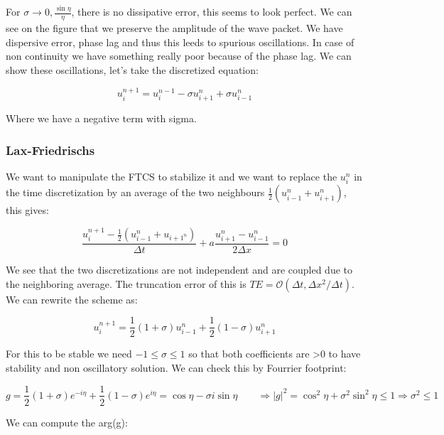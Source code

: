 For $\sigma \rightarrow 0, \frac{\sin \eta }{\eta}$, there is no dissipative error, this seems to look perfect. We can see on the figure that we preserve the amplitude of the wave packet. We have dispersive error, phase lag and thus this leeds to spurious oscillations. In case of non continuity we have something really poor because of the phase lag. We can show these oscillations, let's take the discretized equation: 

\begin{equation}
u^{n+1}_i = u^{n-1}_i - \sigma u_{i+1}^n + \sigma u_{i-1}^n
\end{equation}

Where we have a negative term with sigma. 

\subsubsection{Lax-Friedrischs}
We want to manipulate the FTCS to stabilize it and we want to replace the $u_i^n$ in the time discretization by an average of the two neighbours $\frac{1}{2} (u_{i-1}^n + u_{i+1}^n)$, this gives: 

\begin{equation}
\frac{u_i ^{n+1} - \frac{1}{2}(u_{i-1}^n + u_{i+1 ^n})}{\Delta t} + a \frac{u_{i+1}^n - u_{i-1}^n}{2\Delta x} = 0
\end{equation}

We see that the two discretizations are not independent and are coupled due to the neighboring average. The truncation error of this is $TE = \mathcal{O} (\Delta t, \Delta x^2 / \Delta t)$. We can rewrite the scheme as: 

\begin{equation}
u_i^{n+1} = \frac{1}{2} (1 + \sigma )u_{i-1}^n + \frac{1}{2} (1- \sigma ) u_{i+1}^n
\end{equation}

For this to be stable we need $-1 \leq \sigma \leq 1$ so that both coefficients are >0 to have stability and non oscillatory solution. We can check this by Fourrier footprint: 

\begin{equation}
g = \frac{1}{2} (1+\sigma) e^{-i\eta} + \frac{1}{2}(1-\sigma) e^{i\eta} = \cos \eta - \sigma i \sin \eta \qquad \Rightarrow |g|^2
 = \cos ^2 \eta + \sigma ^2 \sin ^2 \eta \leq 1 \Rightarrow \sigma ^2 \leq 1
 \end{equation}
 
We can compute the arg(g): 
 
